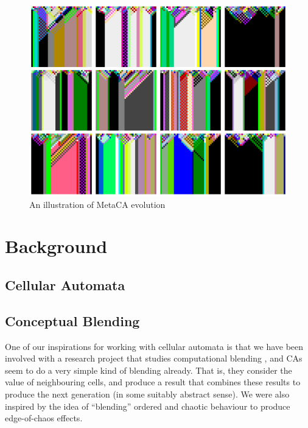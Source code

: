 \documentclass{AISB2008}
\begin{document}
\begin{figure}
\includegraphics[width=\columnwidth]{metaca.png}
\caption{An illustration of MetaCA evolution\label{metaca-taster}}
\end{figure}

\newpage

\section{Background}

\subsection{Cellular Automata}



\subsection{Conceptual Blending} \label{sec:blend}

One of our inspirations for working with cellular automata is that we
have been involved with a research project that studies computational
blending \cite{schorlemmer2014coinvent}, and CAs seem to do a very
simple kind of blending already.  That is, they consider the value of
neighbouring cells, and produce a result that combines these results
to produce the next generation (in some suitably abstract sense).  We
were also inspired by the idea of ``blending'' ordered and chaotic
behaviour to produce edge-of-chaos effects.
\end{document}

